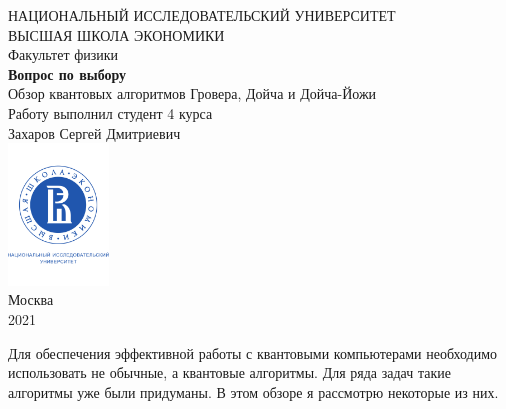 \documentclass[a4paper, 12pt]{article}
\begin{document}
	\begin{titlepage}
		\begin{center}
			$$$$
			$$$$
			$$$$
			$$$$
			{\Large{НАЦИОНАЛЬНЫЙ ИССЛЕДОВАТЕЛЬСКИЙ УНИВЕРСИТЕТ}}\\
			\vspace{0.1cm}
			{\Large{ВЫСШАЯ ШКОЛА ЭКОНОМИКИ}}\\
			\vspace{0.25cm}
			{\large{Факультет физики}}\\
			\vspace{5.5cm}
			{\Huge\textbf{{Вопрос по выбору}}}\\%
			\vspace{1cm}
			{\LARGE{Обзор квантовых алгоритмов Гровера, Дойча и Дойча-Йожи}}\\%
			\vspace{2cm}
			{Работу выполнил студент 4 курса}\\
			{Захаров Сергей Дмитриевич}\\
			\vfill
			\includegraphics[width = 0.2\textwidth]{HSElogo}\\
			\vfill
			Москва\\
			2021
		\end{center}
	\end{titlepage}
	
\tableofcontents


\newpage

Для обеспечения эффективной работы с квантовыми компьютерами необходимо использовать не обычные, а квантовые алгоритмы. Для ряда задач такие алгоритмы уже были придуманы. В этом обзоре я рассмотрю некоторые из них.
\end{document}
